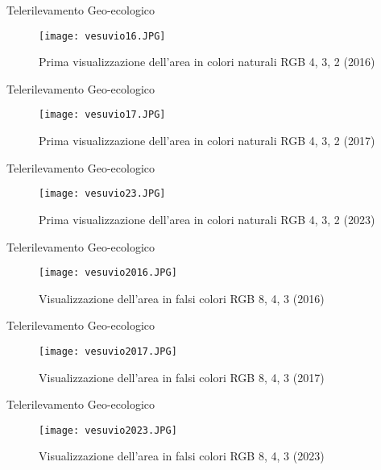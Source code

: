 \documentclass[10pt,aspectratio=169]{beamer}
\begin{document}
\begin{frame}[fragile]{Telerilevamento Geo-ecologico}

\begin{figure}[h]
	\centering
	\texttt{[image: vesuvio16.JPG]}
	\caption{Prima visualizzazione dell'area in colori naturali 
 RGB 4, 3, 2 (2016)}
	\label{fig1}
\end{figure}
\end{frame}
\begin{frame}[fragile]{Telerilevamento Geo-ecologico}

\begin{figure}[h]
	\centering
	\texttt{[image: vesuvio17.JPG]}
	\caption{Prima visualizzazione dell'area in colori naturali 
 RGB 4, 3, 2 (2017)}
	\label{fig1}
\end{figure}
\end{frame}
\begin{frame}[fragile]{Telerilevamento Geo-ecologico}

\begin{figure}[h]
	\centering
	\texttt{[image: vesuvio23.JPG]}
	\caption{Prima visualizzazione dell'area in colori naturali 
 RGB 4, 3, 2 (2023)}
	\label{fig1}
\end{figure}
\end{frame}

\begin{frame}[fragile]{Telerilevamento Geo-ecologico}

\begin{figure}[h]
	\centering
	\texttt{[image: vesuvio2016.JPG]}
	\caption{Visualizzazione dell'area in falsi colori  
 RGB 8, 4, 3 (2016)}
	\label{fig1}
\end{figure}
\end{frame}
\begin{frame}[fragile]{Telerilevamento Geo-ecologico}

\begin{figure}[h]
	\centering
	\texttt{[image: vesuvio2017.JPG]}
	\caption{Visualizzazione dell'area in falsi colori  
 RGB 8, 4, 3 (2017)}
	\label{fig1}
\end{figure}
\end{frame}
\begin{frame}[fragile]{Telerilevamento Geo-ecologico}

\begin{figure}[h]
	\centering
	\texttt{[image: vesuvio2023.JPG]}
	\caption{Visualizzazione dell'area in falsi colori  
 RGB 8, 4, 3 (2023)}
	\label{fig1}
\end{figure}
\end{frame}
\end{document}
